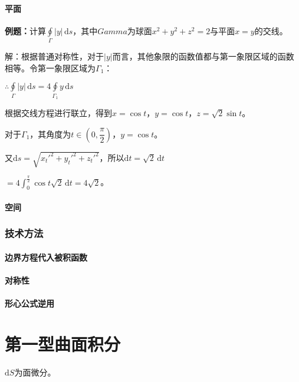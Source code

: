\documentclass[UTF8, 12pt]{ctexart}
\begin{document}
\paragraph{平面} \leavevmode \medskip

\textbf{例题：}计算$\oint\limits_\Gamma\vert y\vert\,\textrm{d}s$，其中$Gamma$为球面$x^2+y^2+z^2=2$与平面$x=y$的交线。

解：根据普通对称性，对于$\vert y\vert$而言，其他象限的函数值都与第一象限区域的函数相等。令第一象限区域为$\Gamma_1$：

$\therefore\oint\limits_\Gamma\vert y\vert\,\textrm{d}s=4\oint\limits_{\Gamma_1}y\,\textrm{d}s$

根据交线方程进行联立，得到$x=\cos t$，$y=\cos t$，$z=\sqrt{2}\sin t$。

对于$\Gamma_1$，其角度为$t\in\left(0,\dfrac{\pi}{2}\right)$，$y=\cos t$。

又$\textrm{d}s=\sqrt{x_t'^2+y_t'^2+z_t'^2}$，所以$\textrm{d}t=\sqrt{2}\,\textrm{d}t$

$=4\int_0^\frac{\pi}{2}\cos t\sqrt{2}\,\textrm{d}t=4\sqrt{2}$。

\paragraph{空间} \leavevmode \medskip

\subsubsection{技术方法}

\paragraph{边界方程代入被积函数} \leavevmode \medskip

\paragraph{对称性} \leavevmode \medskip

\paragraph{形心公式逆用} \leavevmode \medskip

\section{第一型曲面积分}

$\textrm{d}S$为面微分。
\end{document}
